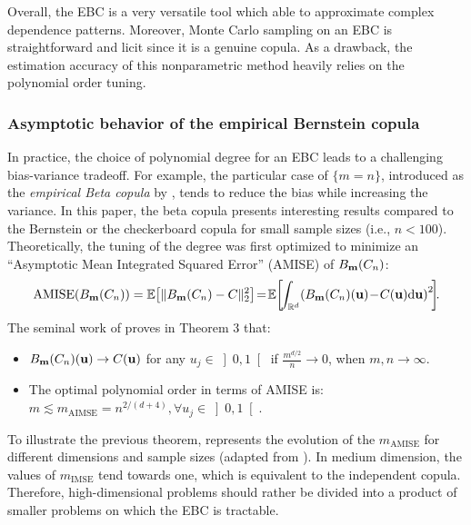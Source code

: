 Overall, the EBC is a very versatile tool which able to approximate complex dependence patterns. 
Moreover, Monte Carlo sampling on an EBC is straightforward and licit since it is a genuine copula. 
As a drawback, the estimation accuracy of this nonparametric method heavily relies on the polynomial order tuning.   


\subsubsection{Asymptotic behavior of the empirical Bernstein copula}
In practice, the choice of polynomial degree for an EBC leads to a challenging bias-variance tradeoff. 
For example, the particular case of $\{m = n\}$, introduced as the \textit{empirical Beta copula} by \cite{segers_2017}, tends to reduce the bias while increasing the variance. 
In this paper, the beta copula presents interesting results compared to the Bernstein or the checkerboard copula for small sample sizes (i.e., $n<100$). 
Theoretically, the tuning of the degree was first optimized to minimize an ``Asymptotic Mean Integrated Squared Error'' (AMISE) of $B_{{\bf m}}(C_n)$: 
\begin{equation}
    \mathrm{AMISE}(B_{\bm}(C_n)) = \E\!\left[ \lVert B_{\bm}(C_n) - C \rVert^2_2 \right] \!=\! \E\!\left[\!\int_{\R^d}\! \left(B_{\bm}(C_n)(\bu) \!-\! C(\bu) \dd \bu \right)^2 \!\right]\!\!.
    \label{eq:aimse}
\end{equation}
The seminal work of \citet{sancetta_satchell_2004} proves in Theorem 3 that: 
\begin{itemize}
    \item $B_{{\bf m}}(C_n)({\bf u}) \rightarrow C({\bf u})$ for any $u_j \in \left]0, 1\right[$ if $\frac{m^{d/2}}{n} \rightarrow 0$, when $m, n \rightarrow \infty$.
    \item The optimal polynomial order in terms of AMISE is\footnotemark: $m \lesssim m_{\mathrm{AIMSE}} = n^{2/(d+4)}, \forall u_j \in \left]0, 1\right[$.    
\end{itemize}
To illustrate the previous theorem,  represents the evolution of the $m_{\mathrm{AMISE}}$ for different dimensions and sample sizes (adapted from \citealt{lasserre_2022}). 
In medium dimension, the values of $m_{\mathrm{IMSE}}$ tend towards one, which is equivalent to the independent copula. 
Therefore, high-dimensional problems should rather be divided into a product of smaller problems on which the EBC is tractable.

